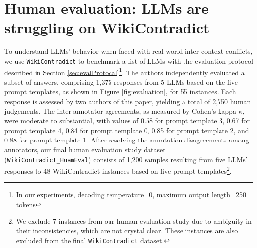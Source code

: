 \section{Human evaluation: LLMs are struggling on WikiContradict}
\label{sec:human_eval}

To understand LLMs' behavior when faced with real-world inter-context conflicts, we use \texttt{WikiContradict} to benchmark a list of LLMs with the evaluation protocol described in Section \ref {sec:evalProtocal}\footnote{In our experiments, decoding temperature=0, maximum output length=250 tokens}.
The authors independently evaluated a subset of answers, comprising 1,375 responses from 5 LLMs based on the five prompt templates, as shown in Figure \ref{fig:evaluation}, for 55 instances. Each response is assessed by two authors of this paper, yielding a total of 2,750 human judgements. The inter-annotator agreements, as measured by Cohen's kappa $\kappa$, were moderate to substantial, with values of 0.58 for prompt template 3, 0.67 for prompt template 4, 0.84 for prompt template 0, 0.85 for prompt template 2, and 0.88 for prompt template 1. After resolving the annotation disagreements among annotators, our final human evaluation study dataset (\texttt{WikiContradict\_HuamEval}) consists of 1,200 samples resulting from five LLMs’ responses to 48 WikiContradict instances based on five prompt templates\footnote{We exclude 7 instances from our human evaluation study due to ambiguity in their inconsistencies, which are not crystal clear. These instances are also excluded from the final \texttt{WikiContradict} dataset.}.



